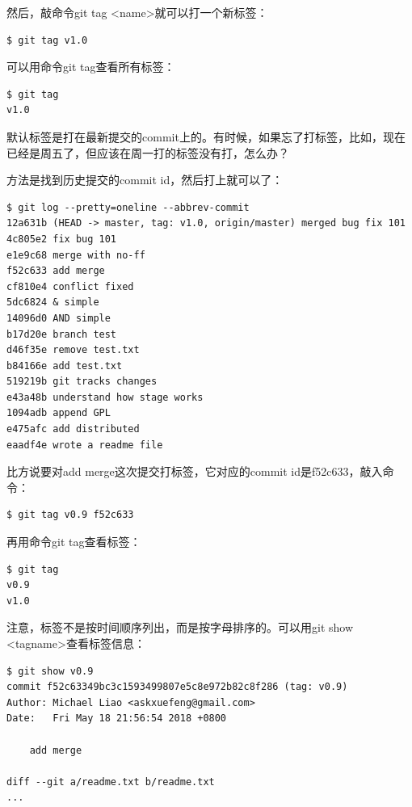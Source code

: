 然后，敲命令git tag <name>就可以打一个新标签：

\begin{verbatim}
$ git tag v1.0
\end{verbatim}

可以用命令git tag查看所有标签：

\begin{verbatim}
$ git tag
v1.0
\end{verbatim}

默认标签是打在最新提交的commit上的。有时候，如果忘了打标签，比如，现在已经是周五了，但应该在周一打的标签没有打，怎么办？

方法是找到历史提交的commit id，然后打上就可以了：

\begin{verbatim}
$ git log --pretty=oneline --abbrev-commit
12a631b (HEAD -> master, tag: v1.0, origin/master) merged bug fix 101
4c805e2 fix bug 101
e1e9c68 merge with no-ff
f52c633 add merge
cf810e4 conflict fixed
5dc6824 & simple
14096d0 AND simple
b17d20e branch test
d46f35e remove test.txt
b84166e add test.txt
519219b git tracks changes
e43a48b understand how stage works
1094adb append GPL
e475afc add distributed
eaadf4e wrote a readme file
\end{verbatim}

比方说要对add merge这次提交打标签，它对应的commit id是f52c633，敲入命令：

\begin{verbatim}
$ git tag v0.9 f52c633
\end{verbatim}

再用命令git tag查看标签：

\begin{verbatim}
$ git tag
v0.9
v1.0
\end{verbatim}

注意，标签不是按时间顺序列出，而是按字母排序的。可以用git show <tagname>查看标签信息：

\begin{verbatim}
$ git show v0.9
commit f52c63349bc3c1593499807e5c8e972b82c8f286 (tag: v0.9)
Author: Michael Liao <askxuefeng@gmail.com>
Date:   Fri May 18 21:56:54 2018 +0800

    add merge

diff --git a/readme.txt b/readme.txt
...
\end{verbatim}

